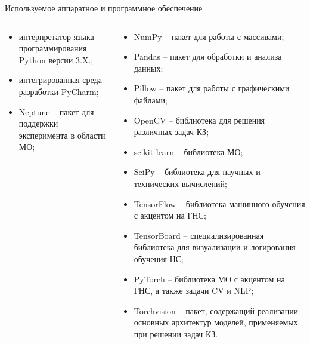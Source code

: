 \documentclass[10pt]{beamer}
\begin{document}
\begin{frame}{Используемое аппаратное и программное обеспечение}
\begin{columns}[T]
\begin{column}[T]{0.5\textwidth}
\begin{itemize}
                        \item интерпретатор языка программирования Python версии 3.X.;
                        \item интегрированная среда разработки PyCharm;
                        \item Neptune -- пакет для поддержки эксперимента в области МО;
                    \end{itemize}
                \end{column}
                \begin{column}{0.5\textwidth}
                    \begin{itemize}
                        \item NumPy -- пакет для работы с массивами;
                        \item Pandas -- пакет для обработки и анализа данных;
                        \item Pillow -- пакет для работы с графическими файлами;
                        \item OpenCV -- библиотека для решения различных задач КЗ;
                        \item scikit-learn -- библиотека МО;
                        \item SciPy -- библиотека для научных и технических вычислений;
                        \item TensorFlow -- библиотека машинного обучения с акцентом на ГНС;
                        \item TensorBoard -- специализированная библиотека для визуализации и логирования обучения НС;
                        \item PyTorch -- библиотека МО с акцентом на ГНС, а также задачи CV и NLP;
                        \item Torchvision -- пакет, содержащий реализации основных архитектур моделей, применяемых при решении задач КЗ.
                    \end{itemize}
                \end{column}
            \end{columns}
        \end{frame}
\end{document}
